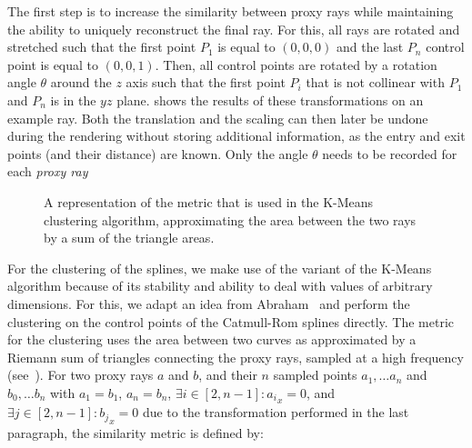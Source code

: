 The first step is to increase the similarity between proxy rays while maintaining the ability to uniquely reconstruct the final ray.  For this, all rays are rotated and stretched such that the first point $P_1$ is equal to $(0,0,0)$ and the last $P_n$ control point is equal to $(0,0,1)$.  Then, all control points are rotated by a rotation angle $\theta$ around the $z$ axis such that the first point $P_i$ that is not collinear with $P_1$ and $P_n$ is in the $yz$ plane.   shows the results of these transformations on an example ray.  Both the translation and the scaling can then later be undone during the rendering without storing additional information, as the entry and exit points (and their distance) are known.  Only the angle $\theta$ needs to be recorded for each \emph{proxy ray}

\begin{figure}
\centering
{}
\caption{A representation of the metric that is used in the K-Means clustering algorithm, approximating the area between the two rays by a sum of the triangle areas.}
\label{contributions:fem:metric}
\end{figure}
\cite{meyer2009voreen}
For the clustering of the splines, we make use of the variant of the K-Means~\cite{hartigan75kmeans} algorithm because of its stability and ability to deal with values of arbitrary dimensions.  For this, we adapt an idea from Abraham~\etal \cite{abraham03clustering} and perform the clustering on the control points of the Catmull-Rom splines directly.  The metric for the clustering uses the area between two curves as approximated by a Riemann sum of triangles connecting the proxy rays, sampled at a high frequency (see~).  For two proxy rays $a$ and $b$, and their $n$ sampled points $a_1, \dots a_n$ and $b_0, \dots b_n$ with $a_1 = b_1$, $a_n = b_n$, $\exists i\in[2, n-1] : a{_i}_x = 0$, and $\exists j\in[2, n-1] : b{_j}_x = 0$ due to the transformation performed in the last paragraph, the similarity metric is defined by:

